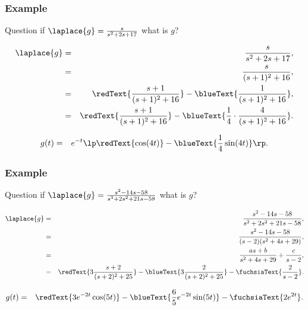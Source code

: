 \begin{frame}
  \frametitle{Example}

  \begin{block}{Question}
    if $\laplace{g}=\frac{s}{s^2+2s+17}$ what is $g$?
  \end{block}

    {
      \begin{eqnarray*}
        \laplace{g} & = & \frac{s}{s^2+2s+17}, \\
        & = & \frac{s}{(s+1)^2+16}, \\
        & = & \redText{\frac{s+1}{(s+1)^2+16}} - \blueText{\frac{1}{(s+1)^2+16}}, \\
        & = & \redText{\frac{s+1}{(s+1)^2+16}} - \blueText{\frac{1}{4}\cdot\frac{4}{(s+1)^2+16}}.
      \end{eqnarray*}
    }

    {
      \begin{eqnarray*}
        g(t) & = & e^{-t}\lp \redText{\cos(4t)} - \blueText{\frac{1}{4}\sin(4t)}\rp.
      \end{eqnarray*}
    }


\end{frame}


\begin{frame}
  \frametitle{Example}

  \begin{block}{Question}
    if $\laplace{g}=\frac{s^2-14s-58}{s^3+2s^2+21s-58}$ what is $g$?
  \end{block}

    {
      \begin{eqnarray*}
        \laplace{g} & = & \frac{s^2-14s-58}{s^3+2s^2+21s-58}, \\
        & = & \frac{s^2-14s-58}{(s-2)(s^2+4s+29)}, \\
        & = & \frac{as+b}{s^2+4s+29}+\frac{c}{s-2}, \\
        & = & \redText{3\frac{s+2}{(s+2)^2+25}} - \blueText{3\frac{2}{(s+2)^2+25}}-\fuchsiaText{\frac{2}{s-2}}.
      \end{eqnarray*}
    }

    {
      \begin{eqnarray*}
        g(t) & = & \redText{3e^{-2t}\cos(5t)} - \blueText{\frac{6}{5}e^{-2t}\sin(5t)}-\fuchsiaText{2e^{2t}}.
      \end{eqnarray*}
    }


\end{frame}


